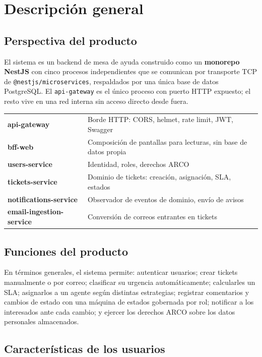 \documentclass[11pt,a4paper]{article}
\begin{document}
\section{Descripción general}

\subsection{Perspectiva del producto}
El sistema es un backend de mesa de ayuda construido como un \textbf{monorepo
NestJS} con cinco procesos independientes que se comunican por transporte TCP
de \texttt{@nestjs/microservices}, respaldados por una única base de datos
PostgreSQL. El \texttt{api-gateway} es el único proceso con puerto HTTP
expuesto; el resto vive en una red interna sin acceso directo desde fuera.

\begin{center}
\begin{tabular}{ll}
\textbf{api-gateway} & Borde HTTP: CORS, helmet, rate limit, JWT, Swagger \\
\textbf{bff-web} & Composición de pantallas para lecturas, sin base de datos propia \\
\textbf{users-service} & Identidad, roles, derechos ARCO \\
\textbf{tickets-service} & Dominio de tickets: creación, asignación, SLA, estados \\
\textbf{notifications-service} & Observador de eventos de dominio, envío de avisos \\
\textbf{email-ingestion-service} & Conversión de correos entrantes en tickets \\
\end{tabular}
\end{center}

\subsection{Funciones del producto}
En términos generales, el sistema permite: autenticar usuarios; crear
tickets manualmente o por correo; clasificar su urgencia automáticamente;
calcularles un SLA; asignarlos a un agente según distintas estrategias;
registrar comentarios y cambios de estado con una máquina de estados
gobernada por rol; notificar a los interesados ante cada cambio; y ejercer
los derechos ARCO sobre los datos personales almacenados.

\subsection{Características de los usuarios}
\end{document}
